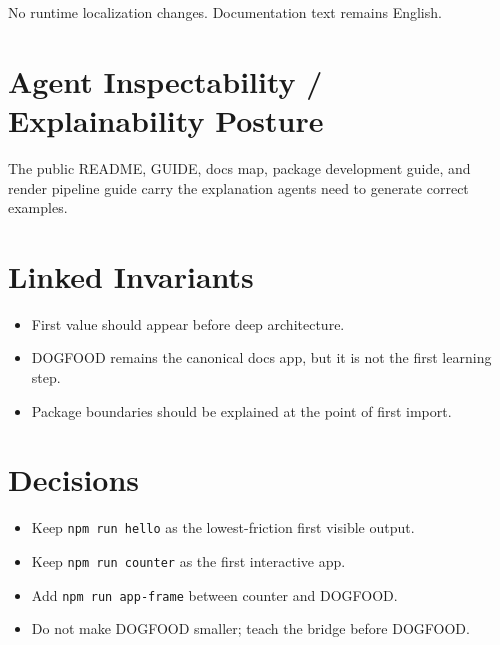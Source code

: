 No runtime localization changes. Documentation text remains English.

\section{Agent Inspectability / Explainability Posture}\label{record-148-agent-inspectability-explainability-posture}

The public README, GUIDE, docs map, package development guide, and render pipeline guide carry the explanation agents need to generate correct examples.

\section{Linked Invariants}\label{record-148-linked-invariants}

\begin{itemize}
\tightlist
\item
  First value should appear before deep architecture.
\item
  DOGFOOD remains the canonical docs app, but it is not the first learning step.
\item
  Package boundaries should be explained at the point of first import.
\end{itemize}

\section{Decisions}\label{record-148-decisions}

\begin{itemize}
\tightlist
\item
  Keep \texttt{n\allowbreak{}p\allowbreak{}m\allowbreak{} \allowbreak{}r\allowbreak{}u\allowbreak{}n\allowbreak{} \allowbreak{}h\allowbreak{}e\allowbreak{}l\allowbreak{}l\allowbreak{}o} as the lowest-friction first visible output.
\item
  Keep \texttt{n\allowbreak{}p\allowbreak{}m\allowbreak{} \allowbreak{}r\allowbreak{}u\allowbreak{}n\allowbreak{} \allowbreak{}c\allowbreak{}o\allowbreak{}u\allowbreak{}n\allowbreak{}t\allowbreak{}e\allowbreak{}r} as the first interactive app.
\item
  Add \texttt{n\allowbreak{}p\allowbreak{}m\allowbreak{} \allowbreak{}r\allowbreak{}u\allowbreak{}n\allowbreak{} \allowbreak{}a\allowbreak{}p\allowbreak{}p\allowbreak{}-\allowbreak{}f\allowbreak{}r\allowbreak{}a\allowbreak{}m\allowbreak{}e} between counter and DOGFOOD.
\item
  Do not make DOGFOOD smaller; teach the bridge before DOGFOOD.
\end{itemize}

